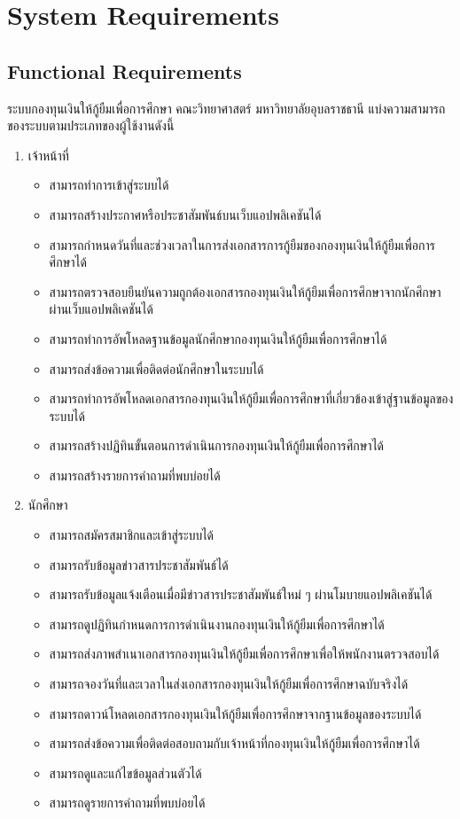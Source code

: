 \section{System Requirements}
\subsection{Functional Requirements}
	ระบบกองทุนเงินให้กู้ยืมเพื่อการศึกษา คณะวิทยาศาสตร์ มหาวิทยาลัยอุบลราชธานี แบ่งความสามารถของระบบตามประเภทของผู้ใช้งานดังนี้
	\begin{enumerate}
		\item เจ้าหน้าที่
			\begin{itemize}[label={--}]
				\item สามารถทำการเข้าสู่ระบบได้
				\item สามารถสร้างประกาศหรือประชาสัมพันธ์บนเว็บแอปพลิเคชันได้
				\item สามารถกำหนดวันที่และช่วงเวลาในการส่งเอกสารการกู้ยืมของกองทุนเงินให้กู้ยืมเพื่อการศึกษาได้
				\item สามารถตรวจสอบยืนยันความถูกต้องเอกสารกองทุนเงินให้กู้ยืมเพื่อการศึกษาจากนักศึกษาผ่านเว็บแอปพลิเคชันได้
				\item สามารถทำการอัพโหลดฐานข้อมูลนักศึกษากองทุนเงินให้กู้ยืมเพื่อการศึกษาได้
				\item สามารถส่งข้อความเพื่อติดต่อนักศึกษาในระบบได้
				\item สามารถทำการอัพโหลดเอกสารกองทุนเงินให้กู้ยืมเพื่อการศึกษาที่เกี่ยวข้องเข้าสู่ฐานข้อมูลของระบบได้
				\item สามารถสร้างปฏิทินขั้นตอนการดำเนินการกองทุนเงินให้กู้ยืมเพื่อการศึกษาได้
				\item สามารถสร้างรายการคำถามที่พบบ่อยได้
			\end{itemize}
		\item นักศึกษา
			\begin{itemize}[label={--}]
				\item สามารถสมัครสมาชิกและเข้าสู่ระบบได้
				\item สามารถรับข้อมูลข่าวสารประชาสัมพันธ์ได้
				\item สามารถรับข้อมูลแจ้งเตือนเมื่อมีข่าวสารประชาสัมพันธ์ใหม่ ๆ ผ่านโมบายแอปพลิเคชันได้
				\item สามารถดูปฏิทินกำหนดการการดำเนินงานกองทุนเงินให้กู้ยืมเพื่อการศึกษาได้
				\item สามารถส่งภาพสำเนาเอกสารกองทุนเงินให้กู้ยืมเพื่อการศึกษาเพื่อให้พนักงานตรวจสอบได้
				\item สามารถจองวันที่และเวลาในส่งเอกสารกองทุนเงินให้กู้ยืมเพื่อการศึกษาฉบับจริงได้
				\item สามารถดาวน์โหลดเอกสารกองทุนเงินให้กู้ยืมเพื่อการศึกษาจากฐานข้อมูลของระบบได้
				\item สามารถส่งข้อความเพื่อติดต่อสอบถามกับเจ้าหน้าที่กองทุนเงินให้กู้ยืมเพื่อการศึกษาได้
				\item สามารถดูและแก้ไขข้อมูลส่วนตัวได้
				\item สามารถดูรายการคำถามที่พบบ่อยได้		
			\end{itemize}
	\end{enumerate}

